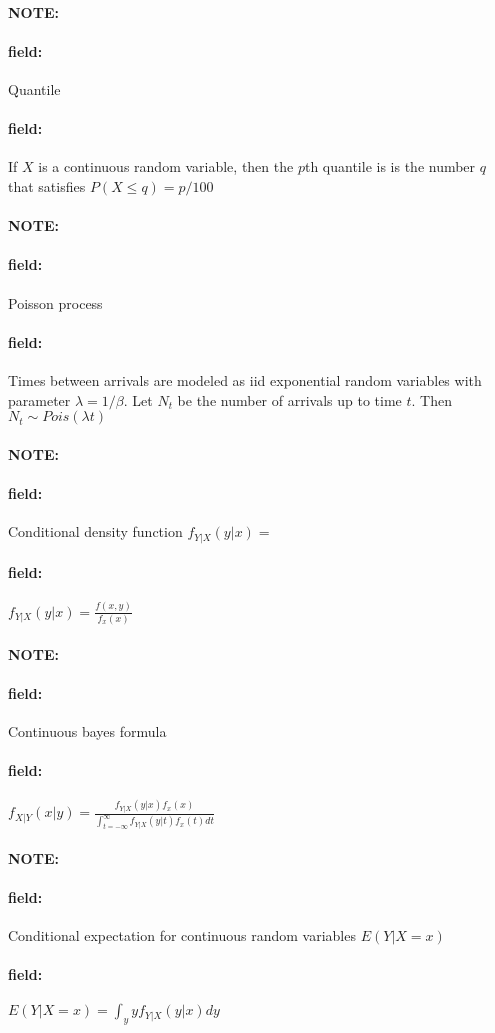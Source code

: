 \documentclass[12pt]{article}
\newenvironment{note}{\paragraph{NOTE:}}{}
\newenvironment{field}{\paragraph{field:}}{}
\begin{document}

\begin{note}
  \begin{field}
    Quantile
  \end{field}
  \begin{field}
    If $X$ is a continuous random variable, then the $p$th quantile is is the number $q$ that satisfies $P(X \leq q) = p/100 $
  \end{field}
\end{note}

\begin{note}
  \begin{field}
    Poisson process
  \end{field}
  \begin{field}
    Times between arrivals are modeled as iid exponential random variables with parameter $\lambda = 1/\beta$. Let $N_t$ be the number of arrivals up to time $t$. Then $N_t \sim Pois(\lambda t)$
  \end{field}
\end{note}


\begin{note}
  \begin{field}
    Conditional density function $f_{Y|X}(y|x) = $
  \end{field}
  \begin{field}
    $f_{Y|X}(y|x) = \frac{f(x,y)}{f_x(x)}$
  \end{field}
\end{note}

\begin{note}
  \begin{field}
    Continuous bayes formula
  \end{field}
  \begin{field}
    $f_{X|Y}(x|y)  = \frac{f_{Y|X}(y|x)f_x(x)}{\int_{t = -\infty}^\infty f_{Y|X}(y|t)f_x(t)dt}$
  \end{field}
\end{note}


\begin{note}
  \begin{field}
    Conditional expectation for continuous random variables
    $E(Y|X = x)$
  \end{field}
  \begin{field}
    $E(Y|X = x) = \int_y y f_{Y|X}(y|x)dy$
  \end{field}
\end{note}
\end{document}
